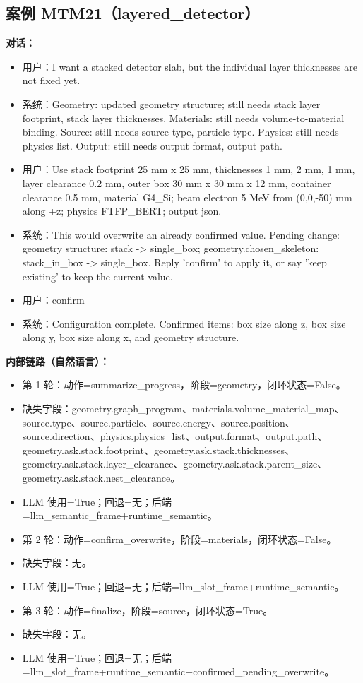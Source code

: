 \documentclass[11pt]{ctexart}
\begin{document}
\subsection{案例 MTM21（layered\_detector）}
\textbf{对话：}
\begin{itemize}
\item 用户：I want a stacked detector slab, but the individual layer thicknesses are not fixed yet.
\item 系统：Geometry: updated geometry structure; still needs stack layer footprint, stack layer thicknesses. Materials: still needs volume-to-material binding. Source: still needs source type, particle type. Physics: still needs physics list. Output: still needs output format, output path.
\item 用户：Use stack footprint 25 mm x 25 mm, thicknesses 1 mm, 2 mm, 1 mm, layer clearance 0.2 mm, outer box 30 mm x 30 mm x 12 mm, container clearance 0.5 mm, material G4\_Si; beam electron 5 MeV from (0,0,-50) mm along +z; physics FTFP\_BERT; output json.
\item 系统：This would overwrite an already confirmed value. Pending change: geometry structure: stack -> single\_box; geometry.chosen\_skeleton: stack\_in\_box -> single\_box. Reply 'confirm' to apply it, or say 'keep existing' to keep the current value.
\item 用户：confirm
\item 系统：Configuration complete. Confirmed items: box size along z, box size along y, box size along x, and geometry structure.
\end{itemize}
\textbf{内部链路（自然语言）：}
\begin{itemize}
\item 第 1 轮：动作=summarize\_progress，阶段=geometry，闭环状态=False。
\item 缺失字段：geometry.graph\_program、materials.volume\_material\_map、source.type、source.particle、source.energy、source.position、source.direction、physics.physics\_list、output.format、output.path、geometry.ask.stack.footprint、geometry.ask.stack.thicknesses、geometry.ask.stack.layer\_clearance、geometry.ask.stack.parent\_size、geometry.ask.stack.nest\_clearance。
\item LLM 使用=True；回退=无；后端=llm\_semantic\_frame+runtime\_semantic。
\item 第 2 轮：动作=confirm\_overwrite，阶段=materials，闭环状态=False。
\item 缺失字段：无。
\item LLM 使用=True；回退=无；后端=llm\_slot\_frame+runtime\_semantic。
\item 第 3 轮：动作=finalize，阶段=source，闭环状态=True。
\item 缺失字段：无。
\item LLM 使用=True；回退=无；后端=llm\_slot\_frame+runtime\_semantic+confirmed\_pending\_overwrite。
\end{itemize}
\end{document}
